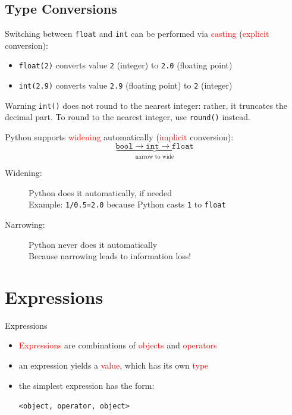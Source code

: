 \documentclass[t,handout,9pt]{beamer}
\begin{document}
\subsection{Type Conversions}
\begin{frame}
Switching between \texttt{float} and \texttt{int} can be performed via \textcolor{red}{casting} (\textcolor{red}{explicit} conversion):
\begin{itemize}
	\item \texttt{float(2)} converts value \texttt{2} (integer) to \texttt{2.0} (floating point)
	\item  \texttt{int(2.9)} converts value \texttt{2.9} (floating point) to \texttt{2} (integer)
\end{itemize}
\begin{block}{Warning}
\texttt{int()} does not round to the nearest integer: rather, it truncates the decimal part. To round to the nearest integer, use \texttt{round()} instead.
\end{block}

Python supports \textcolor{red}{widening} automatically (\textcolor{red}{implicit} conversion):
\begin{equation*}\underbrace{\texttt{bool} \rightarrow \texttt{int} \rightarrow \texttt{float}}_\text{narrow to wide}\end{equation*}
\begin{description}
	\item[Widening:] Python does it automatically, if needed\\
	Example: \texttt{1/0.5=2.0} because Python casts \texttt{1} to \texttt{float}
	\item[Narrowing:] Python never does it automatically\\
	Because narrowing leads to information loss!
\end{description}
\end{frame}
%
\section{Expressions}
\begin{frame}{Expressions}
\vfill
\begin{itemize}
	\item \textcolor{red}{Expressions} are combinations of \textcolor{red}{objects} and \textcolor{red}{operators}
	\item an expression yields a \textcolor{red}{value}, which has its own \textcolor{red}{type}
	\item the simplest expression has the form:
\begin{center}\texttt{<object, operator, object>}\end{center}
\end{itemize}
\vfill
\end{frame}
%
\end{document}
